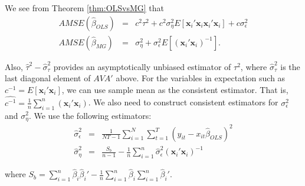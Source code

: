 \documentclass[12pt]{article}
\begin{document}
We see from Theorem \ref{thm:OLSvsMG} that 
\begin{eqnarray}
  AMSE(\widehat{\beta}_{OLS}) &=& c^2 \tau^2 + c^2 \sigma_\eta^2 E[\mathbf{x}_i'\mathbf{x}_i \mathbf{x}_i' \mathbf{x}_i] +  c \sigma_\epsilon^2   \\
  \label{eq:OLSAMSE}
  AMSE(\widehat{\beta}_{MG}) &=& \sigma_\eta^2    + \sigma_\epsilon^2 E[(\mathbf{x}_i'\mathbf{x}_i)^{-1}]
  \label{eq:MGAMSE}.
\end{eqnarray}

Also, $\widehat{\tau}^2 - \widehat{\sigma}_\tau^2$ provides an asymptotically unbiased estimator of $\tau^2$, where $\widehat{\sigma}_\tau^2$ is the last diagonal element of $AVA'$ above. 
For the variables in expectation such as $c^{-1} = E[\mathbf{x}_i'\mathbf{x}_i]$, we can use sample mean as the consistent estimator. That is, $\widehat{c^{-1}} =  \frac{1}{n} \sum_{i=1}^n (\mathbf{x}_i'\mathbf{x}_i) $. We also need to construct consistent estimators for $\sigma_\epsilon^2$ and $\sigma_\eta^2$. We use the following estimators:
\begin{eqnarray}
\widehat{\sigma}_\epsilon^2 &=& \frac{1}{NT - 1} \sum_{i=1}^N \sum_{t=1}^T (y_{it}-x_{it}\widehat{\beta}_{OLS})^2\\
\widehat{\sigma}_\eta^2 &=& \frac{S_b}{n-1} -\frac{1}{n} \sum_{i=1}^n \widehat{\sigma}_\epsilon^2 (\mathbf{x}_i'\mathbf{x}_i)^{-1} 
\end{eqnarray}

where $S_b = \sum_{i=1}^n \widehat{\beta}_i \widehat{\beta}_i' - \frac{1}{n} \sum_{i=1}^n \widehat{\beta}_i \sum_{i=1}^n \widehat{\beta}_i'$. 



 
\end{document}
